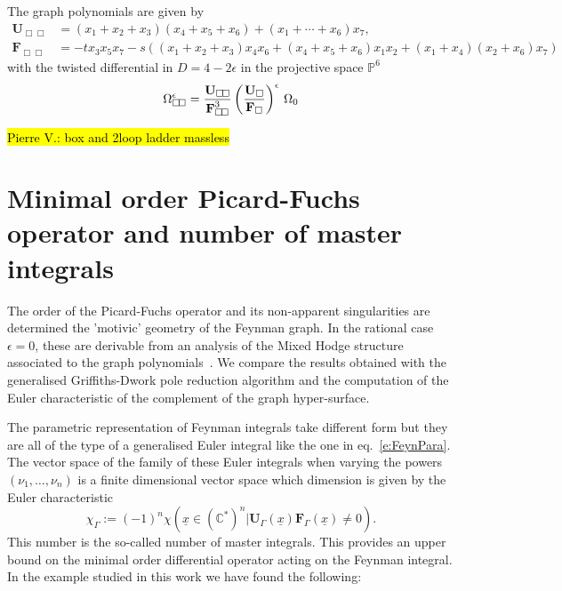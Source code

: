 \documentclass[a4paper,12pt]{article}
\numberwithin{equation}{section}
\numberwithin{figure}{section}
\newcommand{\pvnote}[1]{\sethlcolor{bubblegum} \protect\hl{Pierre V.: #1} \sethlcolor{yellow}}
\begin{document}

The graph polynomials are given by
\begin{align}
  \label{e:DoubleBoxgraphpolynomials}
  \textbf{U}_{\Box\!\Box}&=(x_1+x_2+x_3)(x_4+x_5+x_6)+(x_1+\cdots+x_6)x_7,\\
\nonumber  \textbf{F}_{\Box\!\Box}&=-t x_3x_5x_7-s\left( (x_1+x_2+x_3) x_4x_6+(x_4+x_5+x_6)x_1x_2+(x_1+x_4)(x_2+x_6)x_7\right)
\end{align}
with the twisted differential in $D=4-2\epsilon$ in the projective
space $\mathbb P^6$
\begin{equation}\label{e:OmegaBox}
  \Omega_{\Box\!\Box}^\epsilon=   {\textbf{U}_{\Box\!\Box}  \over
    \textbf{F}_{\Box\!\Box}^{3}}\left(\textbf{U}_{\Box}\over \textbf{F}_{\Box}\right)^\epsilon\,\Omega_0
\end{equation}



\pvnote{box and 2loop ladder massless}
\section{Minimal order Picard-Fuchs operator and number of master integrals}

The order of the Picard-Fuchs operator and its non-apparent
singularities are determined  the 'motivic' geometry of the Feynman
graph. In the rational case $\epsilon=0$, these are derivable from an
analysis of the Mixed Hodge structure associated to the graph
polynomials~\cite{bek,Brown:2009ta,Doran:2023yzu}.
We compare the results obtained with the generalised Griffiths-Dwork
pole reduction
algorithm and the computation of the Euler characteristic of the
complement of the graph hyper-surface.

The parametric representation of Feynman integrals take different form
but they are all of the type of a generalised Euler integral like the
one in eq.~\eqref{e:FeynPara}. The vector space of the family of these
Euler integrals when varying the powers $(\nu_1,\dots,\nu_n)$ is a
finite dimensional vector space which dimension is given by the Euler
characteristic~\cite{Lee:2013hzt,Bitoun:2017nre,Agostini:2022cgv}
\begin{equation}\label{e:chiGamma}
  \chi_\Gamma:=(-1)^n \chi\left(\underline x\in(\mathbb C^*)^n|
  \textbf{U}_\Gamma(\underline x)\textbf{F}_\Gamma(\underline
  x)\neq0\right).
\end{equation} This number is the so-called number of master
integrals. This provides an upper bound on the minimal order
differential operator acting on the Feynman integral. In the example
studied in this work we have found the following:
\end{document}
